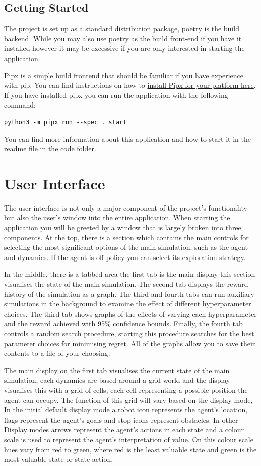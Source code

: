\documentclass[]{final_report}
\begin{document}
\subsection{Getting Started}

The project is set up as a standard distribution package, poetry is the build backend. While you may also use poetry as the build front-end if you have it installed however it may be excessive if you are only interested in starting the application.

Pipx is a simple build frontend that should be familiar if you have experience with pip. You can find instructions on how to \href{https://pipx.pypa.io/stable/installation/}{install Pipx for your platform here}. If you have installed pipx you can run the application with the following command:
\begin{verbatim}
python3 -m pipx run --spec . start
\end{verbatim}
You can find more information about this application and how to start it in the readme file in the code folder.

\section{User Interface}

The user interface is not only a major component of the project's functionality but also the user's window into the entire application. When starting the application you will be greeted by a window that is largely broken into three components. At the top, there is a section which contains the main controls for selecting the most significant options of the main simulation; such as the agent and dynamics. If the agent is off-policy you can select its exploration strategy. 

In the middle, there is a tabbed area the first tab is the main display this section visualises the state of the main simulation. The second tab displays the reward history of the simulation as a graph. The third and fourth tabs can run auxiliary simulations in the background to examine the effect of different hyperparameter choices. The third tab shows graphs of the effects of varying each hyperparameter and the reward achieved with 95\% confidence bounds. Finally, the fourth tab controls a random search procedure, starting this procedure searches for the best parameter choices for minimising regret. All of the graphs allow you to save their contents to a file of your choosing. 

The main display on the first tab visualises the current state of the main simulation, each dynamics are based around a grid world and the display visualises this with a grid of cells, each cell representing a possible position the agent can occupy. The function of this grid will vary based on the display mode, In the initial default display mode a robot icon represents the agent's location, flags represent the agent's goals and stop icons represent obstacles. In other Display modes arrows represent the agent's actions in each state and a colour scale is used to represent the agent's interpretation of value. On this colour scale hues vary from red to green, where red is the least valuable state and green is the most valuable state or state-action.
\end{document}
